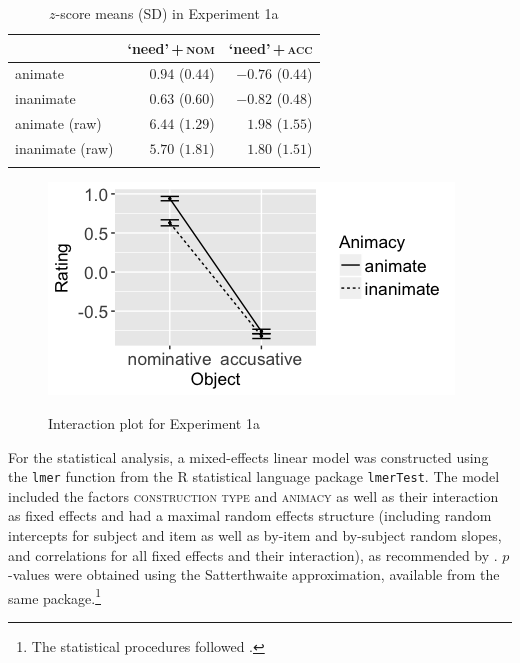 \documentclass[output=paper]{langscibook}
\begin{document}
\begin{table}
\centering
\begin{tabular}{lrr}
\lsptoprule
 & `need'\,+\,\textsc{nom} & `need'\,+\,\textsc{acc}\\
\midrule
animate  &   $0.94$ ($0.44$) &   $-0.76$ ($0.44$)\\
inanimate  &   $0.63$ ($0.60$) &   $-0.82$ ($0.48$)\\
animate (raw)  &   $6.44$ ($1.29$) &   $1.98$ ($1.55$)\\
inanimate (raw)  &   $5.70$ ($1.81$) &   $1.80$ ($1.51$)\\
\lspbottomrule
\end{tabular}
\caption{$z$-score means (SD) in Experiment 1a}
\label{tab:1:means-exp1a}
\end{table}

\begin{figure}
\caption{Interaction plot for Experiment 1a}
\centering
\includegraphics[scale = 0.5]{figures/exp1a_13.png}
\label{fig:exp1a}
\end{figure}

For the statistical analysis, a mixed-effects linear model was constructed using the \texttt{lmer} function from the R statistical language package \texttt{lmerTest}. The model included the factors \textsc{construction type} and \textsc{animacy} as well as their interaction as fixed effects and had a maximal random effects structure (including random intercepts for subject and item as well as by-item and by-subject random slopes, and correlations for all fixed effects and their interaction), as recommended by \citet{Barr.Levy2013}. $p$-values were obtained using the Satterthwaite approximation, available from the same package.\footnote{The statistical procedures followed \citet{Keshev.meltzerAsscher2019}.}
\end{document}
